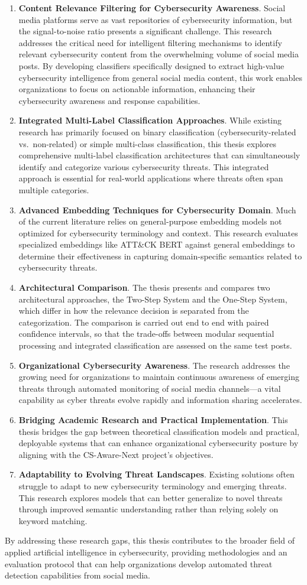 \begin{enumerate}
    \item \textbf{Content Relevance Filtering for Cybersecurity Awareness}. Social media platforms serve as vast repositories of cybersecurity information, but the signal-to-noise ratio presents a significant challenge. This research addresses the critical need for intelligent filtering mechanisms to identify relevant cybersecurity content from the overwhelming volume of social media posts. By developing classifiers specifically designed to extract high-value cybersecurity intelligence from general social media content, this work enables organizations to focus on actionable information, enhancing their cybersecurity awareness and response capabilities.
    \item \textbf{Integrated Multi-Label Classification Approaches}. While existing research has primarily focused on binary classification (cybersecurity-related vs.\ non-related) or simple multi-class classification, this thesis explores comprehensive multi-label classification architectures that can simultaneously identify and categorize various cybersecurity threats. This integrated approach is essential for real-world applications where threats often span multiple categories.
    \item \textbf{Advanced Embedding Techniques for Cybersecurity Domain}. Much of the current literature relies on general-purpose embedding models not optimized for cybersecurity terminology and context. This research evaluates specialized embeddings like ATT{\&}CK BERT against general embeddings to determine their effectiveness in capturing domain-specific semantics related to cybersecurity threats.
    \item \textbf{Architectural Comparison}. The thesis presents and compares two architectural approaches, the Two-Step System and the One-Step System, which differ in how the relevance decision is separated from the categorization. The comparison is carried out end to end with paired confidence intervals, so that the trade-offs between modular sequential processing and integrated classification are assessed on the same test posts.
    \item \textbf{Organizational Cybersecurity Awareness}. The research addresses the growing need for organizations to maintain continuous awareness of emerging threats through automated monitoring of social media channels—a vital capability as cyber threats evolve rapidly and information sharing accelerates.
    \item \textbf{Bridging Academic Research and Practical Implementation}. This thesis bridges the gap between theoretical classification models and practical, deployable systems that can enhance organizational cybersecurity posture by aligning with the CS-Aware-Next project's objectives.
    \item \textbf{Adaptability to Evolving Threat Landscapes}. Existing solutions often struggle to adapt to new cybersecurity terminology and emerging threats. This research explores models that can better generalize to novel threats through improved semantic understanding rather than relying solely on keyword matching.
\end{enumerate}

By addressing these research gaps, this thesis contributes to the broader field of applied artificial intelligence in cybersecurity, providing methodologies and an evaluation protocol that can help organizations develop automated threat detection capabilities from social media.
